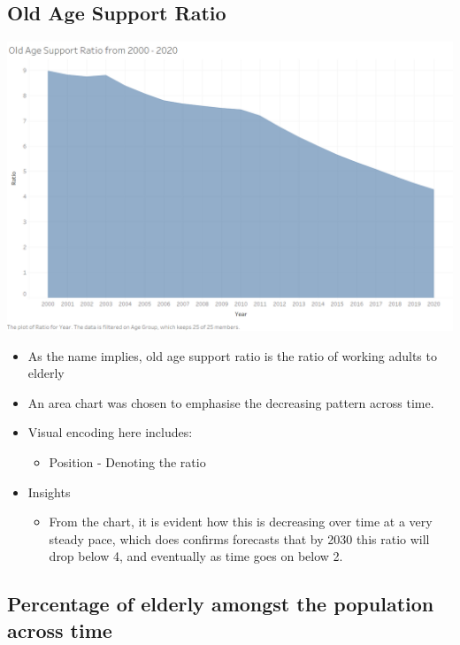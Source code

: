 \documentclass[a4paper, 11pt]{article}
\begin{document}
\subsection{Old Age Support Ratio}
\label{sec:org914f2a1}

\begin{center}
\includegraphics[width=.9\linewidth]{./charts/old age support ratio.png}
\end{center}

\begin{itemize}
\item As the name implies, old age support ratio is the ratio of working adults to elderly
\item An area chart was chosen to emphasise the decreasing pattern across time.
\item Visual encoding here includes:
\begin{itemize}
\item Position - Denoting the ratio
\end{itemize}
\item Insights
\begin{itemize}
\item From the chart, it is evident how this is decreasing over time at a very steady pace, which does confirms forecasts that by 2030 this ratio will drop below 4, and eventually as time goes on below 2.
\end{itemize}
\end{itemize}
\subsection{Percentage of elderly amongst the population across time}
\label{sec:org98964e0}
\end{document}
